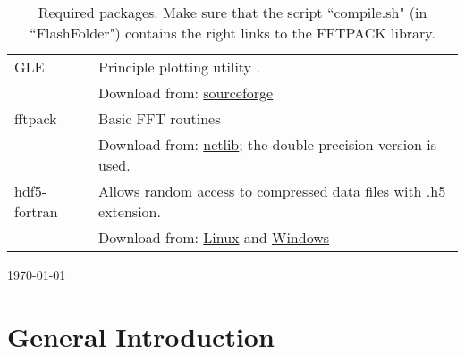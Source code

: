 \documentclass[fleqn,11pt]{book}
\begin{document}
\begin{table}[!ht]
\caption{Required packages. Make sure that the script ``compile.sh" (in ``FlashFolder") contains the right links to the FFTPACK library. }
\begin{tabular}{|l p{14cm}|}
\hline
GLE & Principle plotting utility \cite{GLE}.\\
& Download from: \href{https://glx.sourceforge.io/index.html}{sourceforge}
\\fftpack & Basic FFT routines \cite{FFTPACK}\\
& Download from: \href{http://www.netlib.org/fftpack/}{netlib}; the double precision version is used.
\\hdf5-fortran & Allows random access to compressed data files with \href{https://portal.hdfgroup.org/display/support}{.h5} extension.\\
& Download from: \href{https://www.hdfgroup.org/downloads/hdf5/}{Linux} and \href{https://support.hdfgroup.org/ftp/HDF5/releases/hdf5-1.6/hdf5-1.6.7/src/unpacked/release_docs/INSTALL_Windows.txt}{Windows}
\\\hline
\end{tabular}
\end{table}


\newpage

\tableofcontents


\hfill \today

\chapter{General Introduction}
\end{document}
